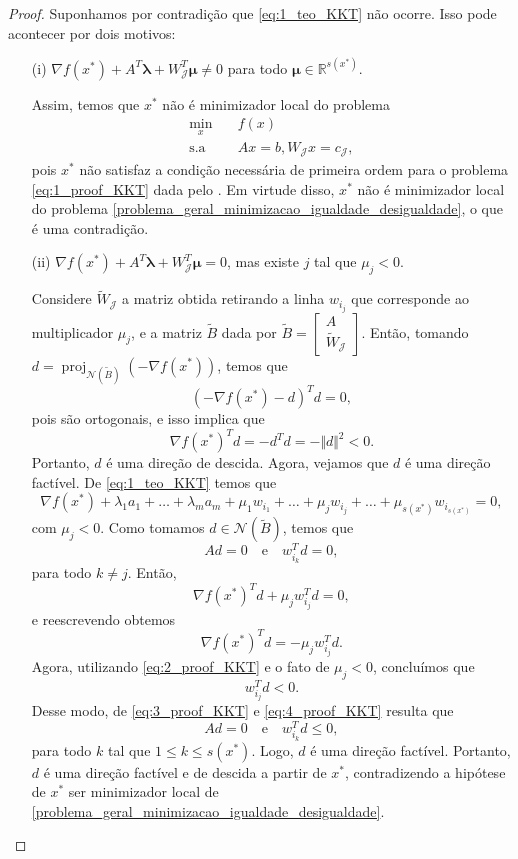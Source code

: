 \documentclass[12pt,a4paper]{scrartcl}
\DeclareMathOperator{\proj}{proj}
\def\RR{\mathds{R}}
\theoremstyle{definition}%
\begin{document}
\begin{proof}
Suponhamos por contradição que \eqref{eq:1_teo_KKT} não ocorre. Isso pode acontecer por dois motivos:
\begin{enumerate}
\item[(i)] $\nabla f(x^{*}) + A^{T}\boldsymbol{\lambda} + W^{T}_{\mathcal{J}} \boldsymbol{\mu} \neq 0$ para todo $\boldsymbol{\mu} \in \RR^{s(x^{*})}$.

Assim, temos que $x^{*}$ não é minimizador local do problema
\[ \label{eq:1_proof_KKT}
\begin{aligned}
\min_{x} & \quad f(x) \\
\text{s.a} & \quad Ax=b, W_{\mathcal{J}}x=c_{\mathcal{J}} ,
\end{aligned}
\]
pois $x^{*}$ não satisfaz a condição necessária de primeira ordem para o problema \eqref{eq:1_proof_KKT} dada pelo . Em virtude disso, $x^{*}$ não é minimizador local do problema \eqref{problema_geral_minimizacao_igualdade_desigualdade}, o que é uma contradição.


\item[(ii)] $\nabla f(x^{*}) + A^{T}\boldsymbol{\lambda} + W^{T}_{\mathcal{J}} \boldsymbol{\mu} = 0$, mas existe $j$ tal que $\mu_{j} <0$. 

Considere $\tilde{W}_{\mathcal{J}}$ a matriz obtida retirando a linha $w_{i_j}$ que corresponde ao multiplicador $\mu_{j}$, e a matriz $\tilde{B}$ dada por $\tilde{B} = \begin{bmatrix*} A \\ \tilde{W}_{\mathcal{J}} \end{bmatrix*}$. Então, tomando $d = \proj_{\mathcal{N}(\tilde{B})} (-\nabla f(x^{*}))$, temos que
\[
(-\nabla f(x^{*}) -d)^{T} d =0,
\]
pois são ortogonais, e isso implica que
\[ \label{eq:2_proof_KKT}
\nabla f(x^{*})^{T} d = - d^{T}d = -\Vert d \Vert^{2} <0.
\]
Portanto, $d$ é uma direção de descida. Agora, vejamos que $d$ é uma direção factível. De \eqref{eq:1_teo_KKT} temos que
\[
\nabla f(x^{*}) + \lambda_{1} a_{1} + \ldots + \lambda_{m} a_{m} + \mu_{1} w_{i_{1}} + \ldots + \mu_{j} w_{i_{j}} + \ldots + \mu_{s(x^{*})} w_{i_{s(x^{*})}} =0,
\]
com $\mu_{j} <0$. Como tomamos $d\in \mathcal{N}(\tilde{B})$, temos que 
\[ \label{eq:3_proof_KKT}
Ad=0 \quad \text{e} \quad w_{i_k}^{T}d = 0,
\]
para todo $k\neq j$. Então, 
\[
\nabla f(x^{*})^{T}d + \mu_{j} w_{i_{j}}^{T}d =0,
\]
e reescrevendo obtemos
\[
\nabla f(x^{*})^{T}d = -\mu_{j} w_{i_{j}}^{T} d.
\]
Agora, utilizando \eqref{eq:2_proof_KKT} e o fato de $\mu_{j} <0$, concluímos que
\[ \label{eq:4_proof_KKT}
w_{i_{j}}^{T} d <0.
\]
Desse modo, de \eqref{eq:3_proof_KKT} e \eqref{eq:4_proof_KKT} resulta que 
\[ 
Ad=0 \quad \text{e} \quad w_{i_k}^{T}d \leq 0,
\]
para todo $k$ tal que $1 \leq k \leq s(x^{*})$. Logo, $d$ é uma direção factível. Portanto, $d$ é uma direção factível e de descida a partir de $x^{*}$, contradizendo a hipótese de $x^{*}$ ser minimizador local de \eqref{problema_geral_minimizacao_igualdade_desigualdade}.
\end{enumerate}	
\end{proof}
\end{document}
